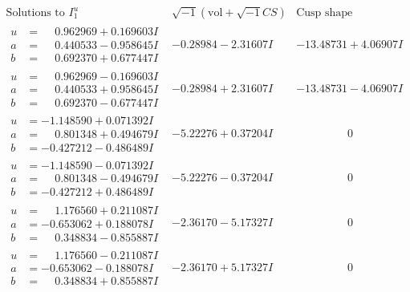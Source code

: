 \documentclass[1p]{elsarticle_modified}
\theoremstyle{definition}
\newcommand{\I}{\sqrt{-1}}
\begin{document}
$$\begin{array}{c|c|c}  
\text{Solutions to }I^u_{1}& \I (\text{vol} + \sqrt{-1}CS) & \text{Cusp shape}\\
 \hline 
\begin{aligned}
u &= \phantom{-}0.962969 + 0.169603 I \\
a &= \phantom{-}0.440533 - 0.958645 I \\
b &= \phantom{-}0.692370 + 0.677447 I\end{aligned}
 & -0.28984 - 2.31607 I & -13.48731 + 4.06907 I \\ \hline\begin{aligned}
u &= \phantom{-}0.962969 - 0.169603 I \\
a &= \phantom{-}0.440533 + 0.958645 I \\
b &= \phantom{-}0.692370 - 0.677447 I\end{aligned}
 & -0.28984 + 2.31607 I & -13.48731 - 4.06907 I \\ \hline\begin{aligned}
u &= -1.148590 + 0.071392 I \\
a &= \phantom{-}0.801348 + 0.494679 I \\
b &= -0.427212 - 0.486489 I\end{aligned}
 & -5.22276 + 0.37204 I & \phantom{-0.000000 } 0 \\ \hline\begin{aligned}
u &= -1.148590 - 0.071392 I \\
a &= \phantom{-}0.801348 - 0.494679 I \\
b &= -0.427212 + 0.486489 I\end{aligned}
 & -5.22276 - 0.37204 I & \phantom{-0.000000 } 0 \\ \hline\begin{aligned}
u &= \phantom{-}1.176560 + 0.211087 I \\
a &= -0.653062 + 0.188078 I \\
b &= \phantom{-}0.348834 - 0.855887 I\end{aligned}
 & -2.36170 - 5.17327 I & \phantom{-0.000000 } 0 \\ \hline\begin{aligned}
u &= \phantom{-}1.176560 - 0.211087 I \\
a &= -0.653062 - 0.188078 I \\
b &= \phantom{-}0.348834 + 0.855887 I\end{aligned}
 & -2.36170 + 5.17327 I & \phantom{-0.000000 } 0 \\ \hline\begin{aligned}

\end{aligned}
\end{array}$$
\end{document}
